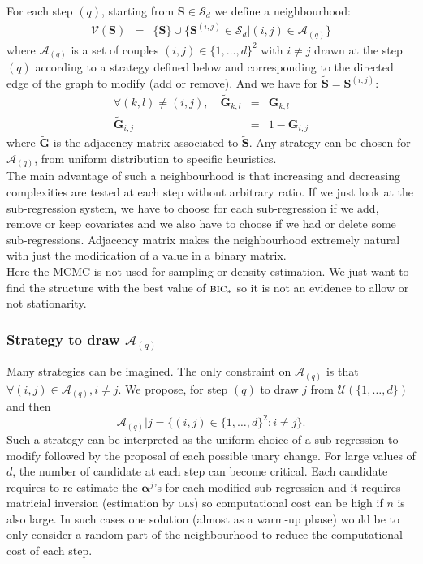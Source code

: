 \documentclass[12pt,a4paper]{report}
\begin{document}
For each step $(q)$, starting from $\boldsymbol{S} \in \mathcal{S}_d$ we define a neighbourhood:
		\begin{eqnarray}
		\mathcal{V}(\boldsymbol{S})&=& \{\boldsymbol{S} \}\cup \{ \boldsymbol{S}^{(i,j)} \in \mathcal{S}_d|(i,j) \in \mathcal{A}_{(q)}\} \nonumber 
	\end{eqnarray}	
	where $\mathcal{A}_{(q)}$ is a set of couples $(i,j) \in \{1,\dots,d \}^2$ with $i\neq j$ drawn at the step $(q)$ according to a strategy defined below and corresponding to the directed edge of the graph to modify (add or remove).
	And we have for  $\tilde{\boldsymbol{S}}=\boldsymbol{S}^{(i,j)}$:
	\begin{eqnarray}
		\forall (k,l)\neq (i,j), \quad	\tilde{\boldsymbol{G}}_{k,l}&=&\boldsymbol{G}_{k,l} \nonumber  \\
		\tilde{\boldsymbol{G}}_{i,j}&=&1-\boldsymbol{G}_{i,j}  \nonumber 
	\end{eqnarray}
	where $\tilde{\boldsymbol{G}}$ is the adjacency matrix associated to $\tilde{\boldsymbol{S}}$. Any strategy can be chosen for $\mathcal{A}_{(q)}$, from uniform distribution to specific heuristics.\\
	
The main advantage of such a neighbourhood is that increasing and decreasing complexities are tested at each step without arbitrary ratio. If we just look at the sub-regression system, we have to choose for each sub-regression if we add, remove or keep covariates and we also have to choose if we had or delete some sub-regressions. Adjacency matrix makes the neighbourhood extremely natural with just the modification of a value in a binary matrix. \\
Here the MCMC is not used for sampling or density estimation. We just want to find the structure with the best value of $\mbox{{\sc bic}}_*$ so it is not an evidence to allow or not stationarity. 
		\subsubsection{Strategy to draw $\mathcal{A}_{(q)}$}
			Many strategies can be imagined. 
		The only constraint on $\mathcal{A}_{(q)}$ is that $\forall (i,j) \in \mathcal{A}_{(q)}, i\neq j$.				
		We propose, for step $(q)$ to draw $j$ from $\mathcal{U}(\{1,\dots,d\})$ and then 
		\begin{equation}
			\mathcal{A}_{(q)}|j=\{ (i,j) \in  \{1,\dots,d\}^2 :i \neq j \}. \nonumber 
		\end{equation}
			Such a strategy can be interpreted as the uniform choice of a sub-regression to modify followed by the proposal of each possible unary change.
			For large values of $d$, the number of candidate at each step can become critical. Each candidate requires to re-estimate the $\boldsymbol{\alpha}^j$'s for each modified sub-regression and it requires matricial inversion (estimation by \textsc{ols}) so computational cost can be high if $n$ is also large. In such cases one solution (almost as a warm-up phase) would be to only consider a random part of the neighbourhood to reduce the computational cost of each step.
\end{document}
